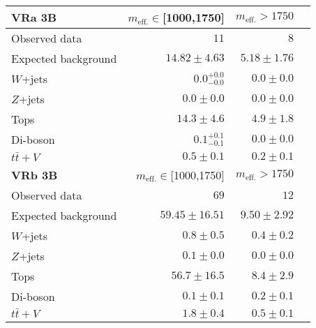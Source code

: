 \begin{table}
  \begin{center}
    \caption{ \label{tab::BGestimation::VRyields_3B}   }

    \begin{tabular*}{\textwidth}{@{\extracolsep{\fill}}lrrr}
      \toprule
      \textbf{VRa 3B} & $m_{\mathrm{eff.}}\in$[1000,1750] & $m_{\mathrm{eff.}}>1750$ \\
      \midrule
Observed data          & $11$              & $8$                    \\
\midrule
Expected background         & $14.82 \pm 4.63$          & $5.18 \pm 1.76$              \\
\midrule
        $W$+jets         & $0.0_{-0.0}^{+0.0}$          & $0.0 \pm 0.0$              \\
        $Z$+jets         & $0.0 \pm 0.0$          & $0.0 \pm 0.0$              \\
        Tops         & $14.3 \pm 4.6$          & $4.9 \pm 1.8$              \\
        Di-boson         & $0.1_{-0.1}^{+0.1}$          & $0.0 \pm 0.0$              \\
        $t\bar{t}+V$         & $0.5 \pm 0.1$          & $0.2 \pm 0.1$              \\
\toprule
\textbf{VRb 3B} & $m_{\mathrm{eff.}}\in$[1000,1750] & $m_{\mathrm{eff.}}>1750$ \\
\midrule
Observed data          & $69$              & $12$                    \\
\midrule
Expected background         & $59.45 \pm 16.51$          & $9.50 \pm 2.92$              \\
\midrule
        $W$+jets         & $0.8 \pm 0.5$          & $0.4 \pm 0.2$              \\
        $Z$+jets         & $0.1 \pm 0.0$          & $0.0 \pm 0.0$              \\
        Tops         & $56.7 \pm 16.5$          & $8.4 \pm 2.9$              \\
        Di-boson         & $0.1 \pm 0.1$          & $0.2 \pm 0.1$              \\
        $t\bar{t}+V$         & $1.8 \pm 0.4$          & $0.5 \pm 0.1$              \\
        \bottomrule
        \end{tabular*}

  \end{center}
\end{table}



